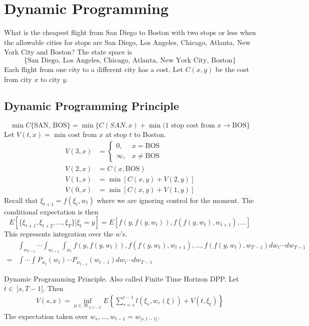 \section{Dynamic Programming}
What is the cheapest flight from San Diego to Boston with two stops or less when the allowable cities for stops are San Diego, Los Angeles, Chicago, Atlanta, New York City and Boston? The state space is
$$\{\text{San Diego, Los Angeles, Chicago, Atlanta, New York City, Boston}\}$$
Each flight from one city to a different city has a cost. Let $C(x,y)$ be the cost from city $x$ to city $y$.

\subsection{Dynamic Programming Principle}
$$\min C\{\text{SAN, BOS}\} = \min\{C(SAN,x) + \min(\text{1 stop cost from }x\to\text{BOS}\}$$
Let $V(t,x) =$ min cost from $x$ at stop $t$ to Boston.
\begin{align*}
V(3,x) &= \begin{cases} 0, & x=\text{BOS} \\ \infty, & x\neq\text{BOS} \end{cases} \\
V(2,x) &= C(x,\text{BOS}) \\
V(1,x) &= \min[C(x,y)+V(2,y)] \\
V(0,x) &= \min[C(x,y)+V(1,y)]
\end{align*}
Recall that $\xi_{t+1}=f(\xi_t,w_t)$ where we are ignoring control for the moment. The conditional expectation is then
$$E[\{\xi_{t+1},\xi_{t+2},\ldots,\xi_T\}|\xi_t=y] = E[f(y,f(y,w_t)),f(f(y,w_t),w_{t+1}),\ldots]$$
This represents integration over the $w$'s.
\begin{align*}
&\int_{w_{T-1}}\cdots\int_{w_{t+1}}\int_{w_t}f(y,f(y,w_t)),f(f(y,w_t),w_{t+1}),\ldots,f(f(y,w_t),w_{T-1})dw_t\cdots dw_{T-1} \\
= &\int\cdots\int P_{w_t}(w_t)\cdots P_{w_{t-1}}(w_{t-1})dw_t\cdots dw_{T-1}
\end{align*}

\begin{theorem}{Dynamic Programming Principle.}
Also called Finite Time Horizon DPP. Let $t\in~]s,T-1[$. Then
\begin{align}
\label{eq:dpp}
V(s,x) = \inf_{\mu\in\mathcal{M}_{]s,t-1[}}E\left\lbrace\sum_{r=s}^{t-1}l(\xi_r,w_r(\xi)) + V(t,\xi_t)\right\rbrace
\end{align}
The expectation taken over $w_s,\ldots,w_{t-1} = w_{]s,t-1[}$.
\end{theorem}

